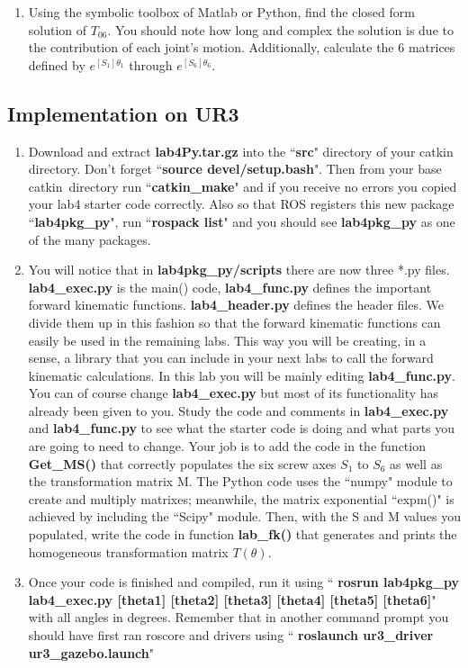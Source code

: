 \begin{enumerate}
\item Using the symbolic toolbox of Matlab or Python, find the closed form solution of $T_{06}$.  You should note how long and complex the solution is due to the contribution of each joint's motion.  Additionally, calculate the 6 matrices defined by $e^{[S_1]\theta_1}$ through $e^{[S_6]\theta_6}$.

\end{enumerate}

\subsection{Implementation on UR3}
\begin{enumerate}
\item Download and extract \textbf{lab4Py.tar.gz} into the ``\textbf{src}" directory of your catkin directory.  Don't forget ``\textbf{source devel/setup.bash}".  Then from your base catkin\
directory run ``\textbf{catkin\_make}" and if you receive no errors you copied your lab4 starter code correctly.  Also so that ROS registers this new package ``\textbf{lab4pkg\_py}",
run ``\textbf{rospack list}" and you should see \textbf{lab4pkg\_py} as one of the many packages.
\item You will notice that in \textbf{lab4pkg\_py/scripts} there are now three *.py files.  \textbf{lab4\_exec.py} is the main() code, \textbf{lab4\_func.py} defines the important
forward kinematic functions. \textbf{lab4\_header.py} defines the header files.  We divide them up in this fashion so that the forward kinematic functions can easily be used in the remaining labs.  This way you will be creating, in a sense, a library that you can include in your next labs to call the forward kinematic calculations.  In this lab you will be mainly editing
\textbf{lab4\_func.py}.  You can of course change \textbf{lab4\_exec.py} but most of its functionality has already been given to you.  Study the code and comments in
\textbf{lab4\_exec.py} and \textbf{lab4\_func.py} to see what the starter code is doing and what parts you are going to need to change. Your job is to add the code in the function \textbf{Get\_MS()} that
correctly populates the six screw axes $S_1$ to $S_6$ as well as the transformation matrix M.  The Python code uses the ``numpy" module to create and multiply matrixes; meanwhile, the matrix exponential ``expm()" is achieved by including the ``Scipy" module.  Then, with the S and M values you populated, write the code in function \textbf{lab\_fk()} that generates and prints the homogeneous transformation matrix $T(\theta)$.

\item Once your code is finished and compiled, run it using `` \textbf{rosrun lab4pkg\_py lab4\_exec.py [theta1] [theta2] [theta3] [theta4] [theta5] [theta6]}" with all angles in
degrees.  Remember that in another command prompt you should have first ran roscore and drivers using
`` \textbf{roslaunch ur3\_driver ur3\_gazebo.launch}"

\end{enumerate}
